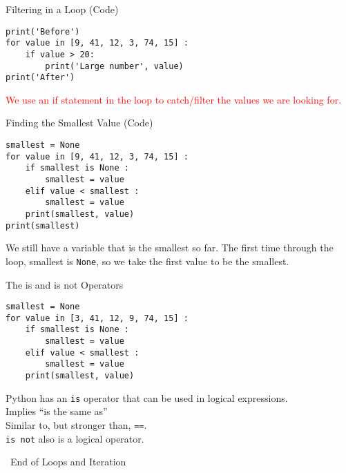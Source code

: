 \documentclass[serif, aspectratio=169]{beamer}
\begin{document}
\begin{frame}[fragile]{Filtering in a Loop (Code)}
    \begin{lstlisting}
print('Before')
for value in [9, 41, 12, 3, 74, 15] :
    if value > 20:
        print('Large number', value)
print('After')
    \end{lstlisting}

    \textcolor{red}{We use an if statement in the loop to catch/filter the values we are looking for.}
\end{frame}

\begin{frame}[fragile]{Finding the Smallest Value (Code)}
    \begin{lstlisting}
smallest = None
for value in [9, 41, 12, 3, 74, 15] :
    if smallest is None : 
        smallest = value
    elif value < smallest : 
        smallest = value
    print(smallest, value)
print(smallest)
    \end{lstlisting}

    We still have a variable that is the smallest so far. The first time through the loop, smallest is \texttt{None}, so we take the first value to be the smallest.
\end{frame}

\begin{frame}[fragile]{The is and is not Operators}
   \begin{lstlisting}
smallest = None
for value in [3, 41, 12, 9, 74, 15] :
    if smallest is None : 
        smallest = value
    elif value < smallest : 
        smallest = value
    print(smallest, value)
   \end{lstlisting}
   
   Python has an \texttt{is} operator that can be used in logical expressions. \\
   Implies “is the same as” \\
   Similar to, but stronger than, \texttt{==}. \\
   \texttt{is not} also is a logical operator.
\end{frame}


\begin{frame}
    \begin{center}
        {\Huge\ End of Loops and Iteration}
    \end{center}
\end{frame}
\end{document}
